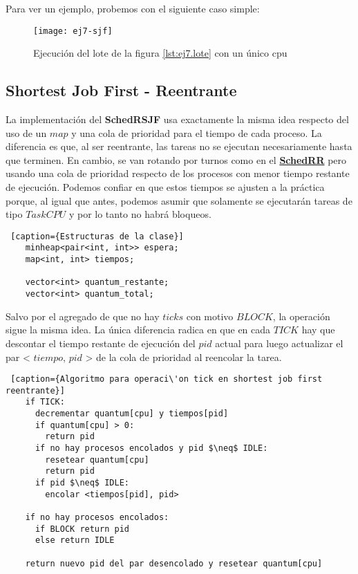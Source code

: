   Para ver un ejemplo, probemos con el siguiente caso simple:

  \begin{center}
  \end{center}
  \label{lst:ej7.lote}

  \begin{figure}[H]
  		\centering
  		\texttt{[image: ej7-sjf]}
  		\caption{Ejecución del lote de la figura \ref{lst:ej7.lote} con un \'unico cpu }
  		\label{fig:ej7.sjf}
  \end{figure}

\subsection{Shortest Job First - Reentrante}

  La implementación del \textbf{SchedRSJF} usa exactamente la misma idea respecto del uso de un $map$ y una cola de prioridad para el tiempo de cada proceso. La diferencia es que, al ser reentrante, las tareas no se ejecutan necesariamente hasta que terminen. En cambio, se van rotando por turnos como en el \hyperref[sec:rr]{\textbf{SchedRR}} pero usando una cola de prioridad respecto de los procesos con menor tiempo restante de ejecución. Podemos confiar en que estos tiempos se ajusten a la práctica porque, al igual que antes, podemos asumir que solamente se ejecutarán tareas de tipo $TaskCPU$ y por lo tanto no habrá bloqueos.

  \begin{lstlisting} [caption={Estructuras de la clase}]
    minheap<pair<int, int>> espera;
    map<int, int> tiempos;

    vector<int> quantum_restante;
    vector<int> quantum_total;
  \end{lstlisting}

  Salvo por el agregado de que no hay $ticks$ con motivo $BLOCK$, la operación sigue la misma idea. La única diferencia radica en que en cada $TICK$ hay que descontar el tiempo restante de ejecución del $pid$ actual para luego actualizar el par < $tiempo$, $pid$ >  de la cola de prioridad al reencolar la tarea.

  \begin{lstlisting} [caption={Algoritmo para operaci\'on tick en shortest job first reentrante}]
    if TICK:
      decrementar quantum[cpu] y tiempos[pid]
      if quantum[cpu] > 0:
        return pid
      if no hay procesos encolados y pid $\neq$ IDLE:
        resetear quantum[cpu]
        return pid
      if pid $\neq$ IDLE:
        encolar <tiempos[pid], pid>

    if no hay procesos encolados:
      if BLOCK return pid
      else return IDLE

    return nuevo pid del par desencolado y resetear quantum[cpu]
  \end{lstlisting}

